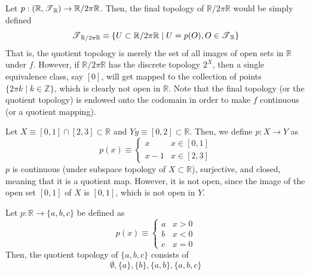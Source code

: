     \begin{example}
      Let $p: (\mathbb{R}, \T_\mathbb{R}) \rightarrow \mathbb{R} / 2 \pi \mathbb{R}$. Then, the final topology of $\mathbb{R} / 2 \pi \mathbb{R}$ would be simply defined 
      \begin{equation}
        \T_{\mathbb{R} / 2 \pi \mathbb{R}} \equiv \{U \subset \mathbb{R} / 2\pi \mathbb{R} \mid U = p(O), O \in \T_\mathbb{R}\}
      \end{equation}
      That is, the quotient topology is merely the set of all images of open sets in $\mathbb{R}$ under $f$. However, if $\mathbb{R} / 2 \pi \mathbb{R}$ has the discrete topology $2^X$, then a single equivalence class, say $[0]$, will get mapped to the collection of points $\{2 \pi k \mid k \in \mathbb{Z}\}$, which is clearly not open in $\mathbb{R}$. Note that the final topology (or the quotient topology) is endowed onto the codomain in order to make $f$ continuous (or a quotient mapping). 
    \end{example}

    \begin{example}
      Let $X \equiv [0,1] \cap [2,3] \subset \mathbb{R}$ and $Y y \equiv [0,2] \subset \mathbb{R}$. Then, we define $p: X \rightarrow Y$ as 
      \begin{equation}
        p(x) \equiv \begin{cases} x & x \in [0,1] \\ x-1 & x \in [2,3] \end{cases}
      \end{equation}
      $p$ is continuous (under subspace topology of $X \subset \mathbb{R}$), surjective, and closed, meaning that it is a quotient map. However, it is not open, since the image of the open set $[0,1]$ of $X$ is $[0,1]$, which is not open in $Y$. 
    \end{example}

    \begin{example}
      Let $p: \mathbb{R} \rightarrow \{a, b, c\}$ be defined as 
      \begin{equation}
        p(x) \equiv \begin{cases} a & x > 0 \\ b & x < 0 \\ c & x = 0 \end{cases}
      \end{equation}
      Then, the quotient topology of $\{a, b, c\}$ consists of 
      \begin{equation}
        \emptyset, \{a\}, \{b\}, \{a, b\}, \{a, b, c\}
      \end{equation}
    \end{example}

